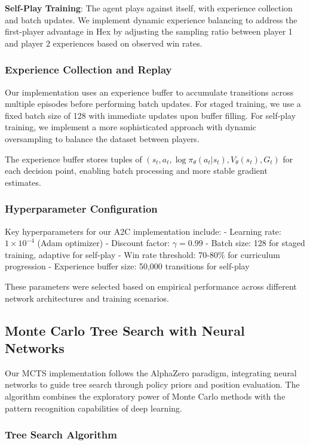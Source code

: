\documentclass[conference]{IEEEtran}
\begin{document}
\textbf{Self-Play Training}: The agent plays against itself, with experience collection and batch updates. We implement dynamic experience balancing to address the first-player advantage in Hex by adjusting the sampling ratio between player 1 and player 2 experiences based on observed win rates.

\subsubsection{Experience Collection and Replay}

Our implementation uses an experience buffer to accumulate transitions across multiple episodes before performing batch updates. For staged training, we use a fixed batch size of 128 with immediate updates upon buffer filling. For self-play training, we implement a more sophisticated approach with dynamic oversampling to balance the dataset between players.

The experience buffer stores tuples of $(s_t, a_t, \log \pi_{\theta}(a_t|s_t), V_{\theta}(s_t), G_t)$ for each decision point, enabling batch processing and more stable gradient estimates.

\subsubsection{Hyperparameter Configuration}

Key hyperparameters for our A2C implementation include:
- Learning rate: $1 \times 10^{-4}$ (Adam optimizer)
- Discount factor: $\gamma = 0.99$
- Batch size: 128 for staged training, adaptive for self-play
- Win rate threshold: 70-80\% for curriculum progression
- Experience buffer size: 50,000 transitions for self-play

These parameters were selected based on empirical performance across different network architectures and training scenarios.

\subsection{Monte Carlo Tree Search with Neural Networks}

Our MCTS implementation follows the AlphaZero paradigm, integrating neural networks to guide tree search through policy priors and position evaluation. The algorithm combines the exploratory power of Monte Carlo methods with the pattern recognition capabilities of deep learning.

\subsubsection{Tree Search Algorithm}
\end{document}
